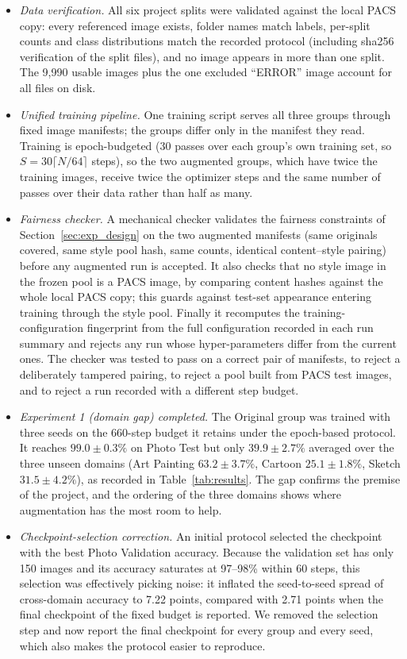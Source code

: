 \documentclass[conference]{IEEEtran}
\begin{document}
\begin{itemize}
\item \textit{Data verification.} All six project splits were validated against the local PACS copy: every referenced image exists, folder names match labels, per-split counts and class distributions match the recorded protocol (including sha256 verification of the split files), and no image appears in more than one split. The 9{,}990 usable images plus the one excluded ``ERROR'' image account for all files on disk.
\item \textit{Unified training pipeline.} One training script serves all three groups through fixed image manifests; the groups differ only in the manifest they read. Training is epoch-budgeted (30 passes over each group's own training set, so $S = 30\lceil N/64\rceil$ steps), so the two augmented groups, which have twice the training images, receive twice the optimizer steps and the same number of passes over their data rather than half as many.
\item \textit{Fairness checker.} A mechanical checker validates the fairness constraints of Section~\ref{sec:exp_design} on the two augmented manifests (same originals covered, same style pool hash, same counts, identical content--style pairing) before any augmented run is accepted. It also checks that no style image in the frozen pool is a PACS image, by comparing content hashes against the whole local PACS copy; this guards against test-set appearance entering training through the style pool. Finally it recomputes the training-configuration fingerprint from the full configuration recorded in each run summary and rejects any run whose hyper-parameters differ from the current ones. The checker was tested to pass on a correct pair of manifests, to reject a deliberately tampered pairing, to reject a pool built from PACS test images, and to reject a run recorded with a different step budget.
\item \textit{Experiment 1 (domain gap) completed.} The Original group was trained with three seeds on the 660-step budget it retains under the epoch-based protocol. It reaches $99.0\pm0.3\%$ on Photo Test but only $39.9\pm2.7\%$ averaged over the three unseen domains (Art Painting $63.2\pm3.7\%$, Cartoon $25.1\pm1.8\%$, Sketch $31.5\pm4.2\%$), as recorded in Table~\ref{tab:results}. The gap confirms the premise of the project, and the ordering of the three domains shows where augmentation has the most room to help.
\item \textit{Checkpoint-selection correction.} An initial protocol selected the checkpoint with the best Photo Validation accuracy. Because the validation set has only 150 images and its accuracy saturates at 97--98\% within 60 steps, this selection was effectively picking noise: it inflated the seed-to-seed spread of cross-domain accuracy to 7.22 points, compared with 2.71 points when the final checkpoint of the fixed budget is reported. We removed the selection step and now report the final checkpoint for every group and every seed, which also makes the protocol easier to reproduce.
\end{itemize}
\end{document}
